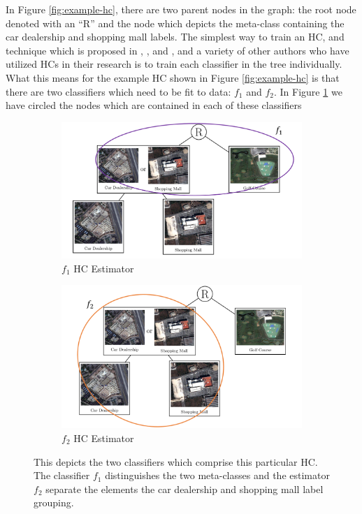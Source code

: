 \documentclass[../thesis.tex]{subfiles}
\begin{document}
In Figure \ref{fig:example-hc}, there are two parent nodes in the graph: the
root node denoted with an ``R'' and the node which depicts the meta-class
containing the car dealership and shopping mall labels. The simplest way to
train an HC, and technique which is proposed in \cite{yan2015hd},
\cite{bengio2010label}, and \cite{aly2005survey}, and a variety of other authors
who have utilized HCs in their research is to train each classifier in the tree
individually. What this means for the example HC shown in Figure
\ref{fig:example-hc} is that there are two classifiers which need to be fit to
data: $f_1$ and $f_2$. In Figure \ref{fig:hc-w-classifiers} we have circled the
nodes which are contained in each of these classifiers
\begin{figure}
    \centering
    \begin{subfigure}{.49\linewidth}
        \centering
        \includegraphics[width=\linewidth]{images/ex-hc1.pdf}
        \caption{$f_1$ HC Estimator}
    \end{subfigure}
    \begin{subfigure}{.49\linewidth}
        \centering
        \includegraphics[width=\linewidth]{images/ex-hc2.pdf}
        \caption{$f_2$ HC Estimator}
    \end{subfigure}
    \caption[Example Hierarchical Classifier with Estimator Delineation]{This
    depicts the two classifiers which comprise this particular HC. The
    classifier $f_1$ distinguishes the two meta-classes and the estimator $f_2$
    separate the elements the car dealership and shopping mall label grouping.}
    \label{fig:hc-w-classifiers}
\end{figure}
\end{document}
